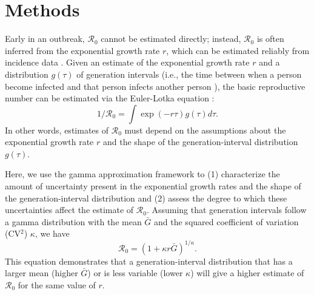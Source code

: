 \documentclass[12pt]{article}
\begin{document}
\section{Methods}

Early in an outbreak, $\mathcal R_0$ cannot be estimated directly;
instead, $\mathcal R_0$ is often inferred from
the exponential growth rate $r$, which can be estimated reliably from incidence data \citep{chowell2003sars, mills2004transmissibility, nishiura2009transmission, nishiura2010pros, ma2014estimating}.
Given an estimate of the exponential growth rate $r$ and a distribution $g(\tau)$ of
generation intervals (i.e., the time between when a person become 
infected and that person infects another person \citep{svensson2007note}), the basic reproductive
number can be estimated via the Euler-Lotka equation \citep{wallinga2007generation}:
\begin{equation}
1/\mathcal R_0 = \int \exp(-r\tau) g(\tau) d\tau.
\end{equation}
In other words, estimates of $\mathcal R_0$ must
depend on the assumptions about the
exponential growth rate $r$ and the shape of the generation-interval distribution $g(\tau)$.

Here, we use the gamma approximation framework \citep{park2019practical} to (1) 
characterize the
amount of uncertainty present in the exponential growth rates and the shape of the generation-interval distribution
and (2) assess the 
degree to which these uncertainties
affect the estimate of $\mathcal R_0$.
Assuming that generation intervals follow a gamma distribution
with the mean $\bar G$ and the squared coefficient of variation (CV$^2$) $\kappa$, 
we have
\begin{equation}
\mathcal R_0 = \left(1 + \kappa r \bar{G}\right)^{1/\kappa}.
\label{eq:gamma}
\end{equation}
This equation demonstrates that a generation-interval distribution
that has a larger mean (higher $\bar{G}$) or is less variable (lower $\kappa$)
will give a higher estimate of $\mathcal R_0$ for the same value of $r$.
\end{document}
